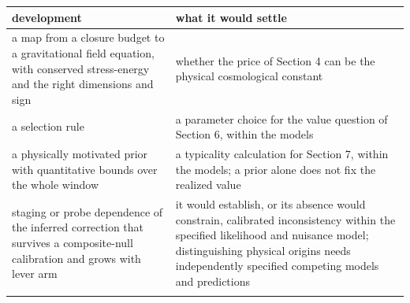 \begin{longtable}[]{@{}ll@{}}
\toprule
\begin{minipage}[b]{0.47\columnwidth}\raggedright
development\strut
\end{minipage} & \begin{minipage}[b]{0.47\columnwidth}\raggedright
what it would settle\strut
\end{minipage}\tabularnewline
\midrule
\endhead
\begin{minipage}[t]{0.47\columnwidth}\raggedright
a map from a closure budget to a gravitational field equation, with
conserved stress-energy and the right dimensions and sign\strut
\end{minipage} & \begin{minipage}[t]{0.47\columnwidth}\raggedright
whether the price of Section 4 can be the physical cosmological
constant\strut
\end{minipage}\tabularnewline
\begin{minipage}[t]{0.47\columnwidth}\raggedright
a selection rule\strut
\end{minipage} & \begin{minipage}[t]{0.47\columnwidth}\raggedright
a parameter choice for the value question of Section 6, within the
models\strut
\end{minipage}\tabularnewline
\begin{minipage}[t]{0.47\columnwidth}\raggedright
a physically motivated prior with quantitative bounds over the whole
window\strut
\end{minipage} & \begin{minipage}[t]{0.47\columnwidth}\raggedright
a typicality calculation for Section 7, within the models; a prior alone
does not fix the realized value\strut
\end{minipage}\tabularnewline
\begin{minipage}[t]{0.47\columnwidth}\raggedright
staging or probe dependence of the inferred correction that survives a
composite-null calibration and grows with lever arm\strut
\end{minipage} & \begin{minipage}[t]{0.47\columnwidth}\raggedright
it would establish, or its absence would constrain, calibrated
inconsistency within the specified likelihood and nuisance model;
distinguishing physical origins needs independently specified competing
models and predictions\strut
\end{minipage}\tabularnewline
\begin{minipage}[t]{0.47\columnwidth}\raggedright

\end{minipage}
\end{longtable}
